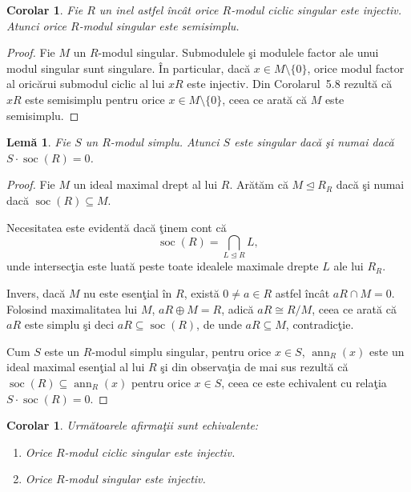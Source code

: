 \documentclass[12pt,a4paper]{book}
\DeclareMathOperator{\soc}{soc}
\DeclareMathOperator{\ann}{ann}
\newcommand{\ess}{\trianglelefteq}  %
\theoremstyle{plain}
\newtheorem{lemma}[theorem]{Lemă}
\newtheorem{corollary}[theorem]{Corolar}
\theoremstyle{definition}
\theoremstyle{remark}
\begin{document}
\begin{corollary}\label{cor:5.10-RO}
Fie \(R\) un inel astfel încât orice \(R\)-modul ciclic singular este injectiv.
Atunci orice \(R\)-modul singular este semisimplu.
\end{corollary}

\begin{proof}
Fie \(M\) un \(R\)-modul singular.
Submodulele şi modulele factor ale unui modul singular sunt singulare.
În particular, dacă \(x \in M \setminus \{0\}\), orice modul factor al
oricărui submodul ciclic al lui \(xR\) este injectiv.
Din Corolarul~5.8 rezultă că \(xR\) este semisimplu pentru orice
\(x \in M \setminus \{0\}\), ceea ce arată că \(M\) este semisimplu.
\end{proof}


\begin{lemma}\label{lem:5.11-RO}
Fie \(S\) un \(R\)-modul simplu.
Atunci \(S\) este singular dacă şi numai dacă
\(S \cdot \soc(R) = 0\).
\end{lemma}

\begin{proof}
Fie \(M\) un ideal maximal drept al lui \(R\).
Arătăm că \(M \ess R_R\) dacă şi numai dacă \(\soc(R) \subseteq M\).

Necesitatea este evidentă dacă ţinem cont că
\[
\soc(R) = \bigcap_{L\ess R} L,
\]
unde intersecţia este luată peste toate idealele maximale drepte \(L\) ale lui \(R_R\).

Invers, dacă \(M\) nu este esenţial în \(R\), există \(0 \neq a \in R\) astfel
încât \(aR \cap M = 0\).
Folosind maximalitatea lui \(M\), \(aR \oplus M = R\), adică
\(aR \cong R / M\), ceea ce arată că \(aR\) este simplu şi deci
\(aR \subseteq \soc(R)\), de unde \(aR \subseteq M\), contradicţie.

Cum \(S\) este un \(R\)-modul simplu singular, pentru orice \(x \in S\),
\(\ann_R(x)\) este un ideal maximal esenţial al lui \(R\) şi din observaţia de
mai sus rezultă că \(\soc(R) \subseteq \ann_R(x)\) pentru orice \(x \in S\),
ceea ce este echivalent cu relaţia \(S \cdot \soc(R) = 0\).
\end{proof}

\begin{corollary}\label{cor:5.12-RO}
Următoarele afirmaţii sunt echivalente:
\begin{enumerate}
  \item Orice \(R\)-modul ciclic singular este injectiv.
  \item Orice \(R\)-modul singular este injectiv.
\end{enumerate}
\end{corollary}
\end{document}
